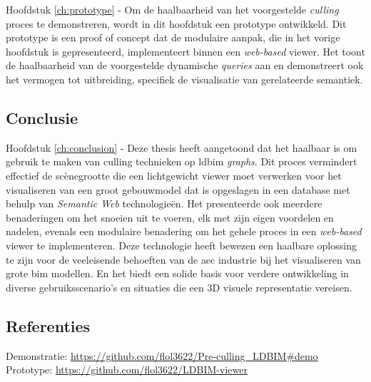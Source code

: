\begin{refsection}
\begin{multicols}{2}
        \textsf{Hoofdstuk \ref{ch:prototype} -}
        Om de haalbaarheid van het voorgestelde \emph{culling} proces te demonstreren, wordt in dit hoofdstuk een prototype ontwikkeld. Dit prototype is een proof of concept dat de modulaire aanpak, die in het vorige hoofdstuk is gepresenteerd, implementeert binnen een \emph{web-based} viewer. Het toont de haalbaarheid van de voorgestelde dynamische \emph{queries} aan en demonstreert ook het vermogen tot uitbreiding, specifiek de visualisatie van gerelateerde semantiek.

        \subsection*{Conclusie}
        \textsf{Hoofdstuk \ref{ch:conclusion} -} Deze thesis heeft aangetoond dat het haalbaar is om gebruik te maken van culling technieken op \ac{ldbim} \emph{graphs}. Dit proces vermindert effectief de scènegrootte die een lichtgewicht viewer moet verwerken voor het visualiseren van een groot gebouwmodel dat is opgeslagen in een database met behulp van \emph{Semantic Web} technologieën. Het presenteerde ook meerdere benaderingen om het snoeien uit te voeren, elk met zijn eigen voordelen en nadelen, evenals een modulaire benadering om het gehele proces in een \emph{web-based} viewer te implementeren. Deze technologie heeft bewezen een haalbare oplossing te zijn voor de veeleisende behoeften van de \ac{aec} industrie bij het visualiseren van grote \ac{bim} modellen. En het biedt een solide basis voor verdere ontwikkeling in diverse gebruiksscenario's en situaties die een 3D visuele representatie vereisen.

    \end{multicols}
    \subsection*{Referenties}
    \small
    {\renewcommand*{\bibfont}{\small}
        \printbibliography}

    \textsf{Demonstratie:} \url{https://github.com/flol3622/Pre-culling_LDBIM#demo}\\
    \textsf{Prototype:} \url{https://github.com/flol3622/LDBIM-viewer}
\end{refsection}